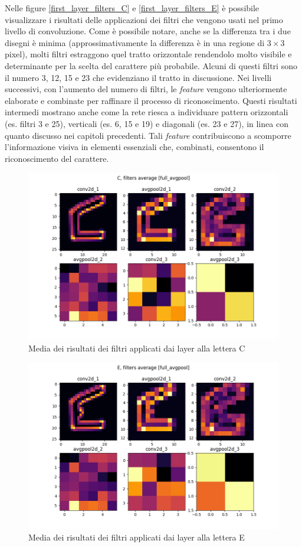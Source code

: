 \documentclass[a4paper,12pt]{article}
\begin{document}
Nelle figure \ref{first_layer_filters_C} e \ref{first_layer_filters_E} è possibile visualizzare i risultati delle applicazioni dei filtri che vengono usati nel primo livello di convoluzione. Come è possibile notare, anche se la differenza tra i due disegni è minima (approssimativamente la differenza è in una regione di $3 \times 3$ pixel), molti filtri estraggono quel tratto orizzontale rendendolo molto visibile e determinante per la scelta del carattere più probabile. Alcuni di questi filtri sono il numero 3, 12, 15 e 23 che evidenziano il tratto in discussione.
Nei livelli successivi, con l'aumento del numero di filtri, le \textit{feature} vengono ulteriormente elaborate e combinate per raffinare il processo di riconoscimento.  
Questi risultati intermedi mostrano anche come la rete riesca a individuare pattern orizzontali (es. filtri 3 e 25), verticali (es. 6, 15 e 19) e diagonali (es. 23 e 27), in linea con quanto discusso nei capitoli precedenti. Tali \textit{feature} contribuiscono a scomporre l'informazione visiva in elementi essenziali che, combinati, consentono il riconoscimento del carattere.

\begin{figure}[H]
\centering
\includegraphics[width=.6\linewidth]{images/C_full_avgpool_filters_avg.png}
\caption{Media dei risultati dei filtri applicati dai layer alla lettera C}
\label{avg_filters_C}
\end{figure}

\begin{figure}[H]
\centering
\includegraphics[width=.6\linewidth]{images/E_full_avgpool_filters_avg.png}
\caption{Media dei risultati dei filtri applicati dai layer alla lettera E}
\label{avg_filters_E}
\end{figure}
\end{document}
